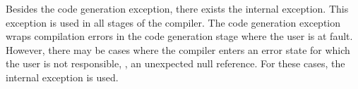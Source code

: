 Besides the code generation exception, there exists the internal exception. This exception is used in all stages of the compiler. The code generation exception wraps compilation errors in the code generation stage where the user is at fault. However, there may be cases where the compiler enters an error state for which the user is not responsible, \eg, an unexpected null reference. For these cases, the internal exception is used.